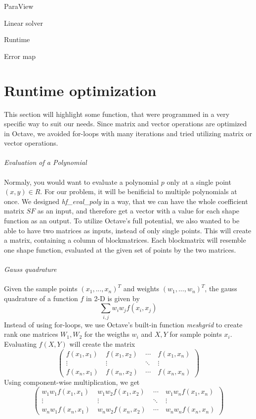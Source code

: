ParaView

Linear solver

Runtime 

Error map

\section{Runtime optimization}
This section will highlight some function, that were programmed in a very specific way to suit our needs. Since matrix and vector operations are optimized in Octave, we avoided for-loops with many iterations and tried utilizing matrix or vector operations.\\ \\
\textit{Evaluation of a Polynomial}\\ \\
Normaly, you would want to evaluate a polynomial $p$ only at a single point $(x,y)\in\!R$. For our problem, it will be benificial to multiple polynomials at once. We designed \textit{hf\_eval\_poly} in a way, that we can have the whole coefficient matrix $SF$ as an input, and therefore get a vector with a value for each shape function as an output. To utilize Octave's full potential, we also wanted to be able to have two matrices as inputs, instead of only single points. This will create a matrix, containing a column of blockmatrices. Each blockmatrix will resemble one shape function, evaluated at the given set of points by the two matrices.\\ \\
\newpage
\textit{Gauss quadrature}\\ \\
Given the sample points $(x_1,...,x_n)^T$ and weights $(w_1,...,w_n)^T$, the gauss quadrature of a function $f$ in 2-D is given by
\[\sum_{i,j} w_i w_j f(x_i,x_j)\]
Instead of using for-loops, we use Octave's built-in function \textit{meshgrid} to create rank one matrices $W_1,W_2$ for the weigths $w_i$ and $X,Y$ for sample points $x_i$. Evaluating $f(X,Y)$ will create the matrix 
\[\begin{pmatrix} f(x_1,x_1) &\ f(x_1,x_2) &\ \cdots &\ f(x_1,x_n) \\
\vdots &\ \vdots &\ \ddots &\ \vdots \\ 
f(x_n,x_1) &\ f(x_n,x_2) &\ \cdots &\ f(x_n,x_n) \end{pmatrix} \]
Using component-wise multiplication, we get 
\[\begin{pmatrix} w_1 w_ 1f(x_1,x_1) &\ w_1 w_2 f(x_1,x_2) &\ \cdots &\ w_1 w_n f(x_1,x_n) \\
\vdots &\ \vdots &\ \ddots &\ \vdots \\ 
w_n w_1 f(x_n,x_1) &\ w_n w_2 f(x_n,x_2) &\ \cdots &\ w_n w_n f(x_n,x_n) \end{pmatrix} \]
